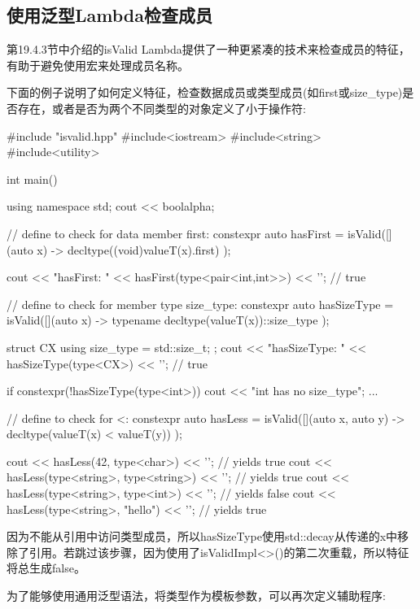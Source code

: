 \subsection{使用泛型Lambda检查成员}

第19.4.3节中介绍的isValid Lambda提供了一种更紧凑的技术来检查成员的特征，有助于避免使用宏来处理成员名称。

下面的例子说明了如何定义特征，检查数据成员或类型成员(如first或size\_type)是否存在，或者是否为两个不同类型的对象定义了小于操作符:

\begin{cpp}
#include "isvalid.hpp"
#include<iostream>
#include<string>
#include<utility>

int main()
{
	using namespace std;
	cout << boolalpha;
	
	// define to check for data member first:
	constexpr auto hasFirst
		= isValid([](auto x) -> decltype((void)valueT(x).first) {
				});

	cout << "hasFirst: " << hasFirst(type<pair<int,int>>) << '\n'; // true
	
	// define to check for member type size_type:
	constexpr auto hasSizeType
		= isValid([](auto x) -> typename decltype(valueT(x))::size_type {
				});
			
	struct CX {
		using size_type = std::size_t;
	};
	cout << "hasSizeType: " << hasSizeType(type<CX>) << '\n'; // true
	
	if constexpr(!hasSizeType(type<int>)) {
		cout << "int has no size_type\n";
		...
	}

	// define to check for <:
	constexpr auto hasLess
		= isValid([](auto x, auto y) -> decltype(valueT(x) < valueT(y)) {
				});
			
	cout << hasLess(42, type<char>) << '\n'; // yields true
	cout << hasLess(type<string>, type<string>) << '\n'; // yields true
	cout << hasLess(type<string>, type<int>) << '\n'; // yields false
	cout << hasLess(type<string>, "hello") << '\n'; // yields true
}
\end{cpp}

因为不能从引用中访问类型成员，所以hasSizeType使用std::decay从传递的x中移除了引用。若跳过该步骤，因为使用了isValidImpl<>()的第二次重载，所以特征将总生成false。

为了能够使用通用泛型语法，将类型作为模板参数，可以再次定义辅助程序:

